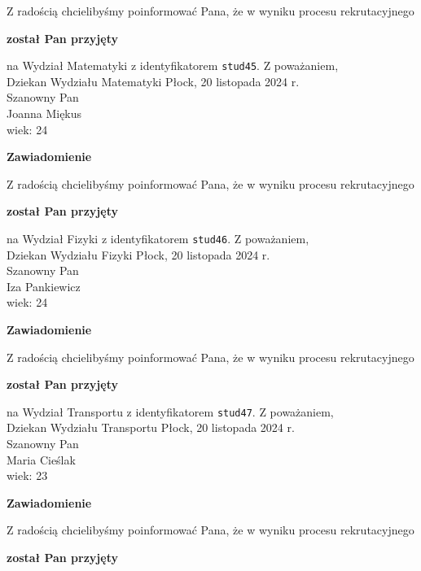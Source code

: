 \documentclass[12pt,a4paper]{article}
\begin{document}
\bigskip
Z radością chcielibyśmy poinformować Pana, że w wyniku procesu rekrutacyjnego 
\begin{center}
\textsf{\textbf{został Pan przyjęty}} 
\end{center}
na Wydział Matematyki z identyfikatorem \verb|stud45|. 
\vspace{2cm}
\noindent
Z poważaniem,\\
Dziekan
Wydziału Matematyki
\newpage
\hfill Płock, 20 listopada 2024 r.\\
\noindent 
Szanowny Pan \\
Joanna Miękus \\
wiek: 24
\bigskip
\begin{center}
 	{\Large\textbf{Zawiadomienie}}
\end{center}
\bigskip
Z radością chcielibyśmy poinformować Pana, że w wyniku procesu rekrutacyjnego 
\begin{center}
\textsf{\textbf{został Pan przyjęty}} 
\end{center}
na Wydział Fizyki z identyfikatorem \verb|stud46|. 
\vspace{2cm}
\noindent
Z poważaniem,\\
Dziekan
Wydziału Fizyki
\newpage
\hfill Płock, 20 listopada 2024 r.\\
\noindent 
Szanowny Pan \\
Iza Pankiewicz \\
wiek: 24
\bigskip
\begin{center}
 	{\Large\textbf{Zawiadomienie}}
\end{center}
\bigskip
Z radością chcielibyśmy poinformować Pana, że w wyniku procesu rekrutacyjnego 
\begin{center}
\textsf{\textbf{został Pan przyjęty}} 
\end{center}
na Wydział Transportu z identyfikatorem \verb|stud47|. 
\vspace{2cm}
\noindent
Z poważaniem,\\
Dziekan
Wydziału Transportu
\newpage
\hfill Płock, 20 listopada 2024 r.\\
\noindent 
Szanowny Pan \\
Maria Cieślak \\
wiek: 23
\bigskip
\begin{center}
 	{\Large\textbf{Zawiadomienie}}
\end{center}
\bigskip
Z radością chcielibyśmy poinformować Pana, że w wyniku procesu rekrutacyjnego 
\begin{center}
\textsf{\textbf{został Pan przyjęty}} 
\end{center}
\end{document}
